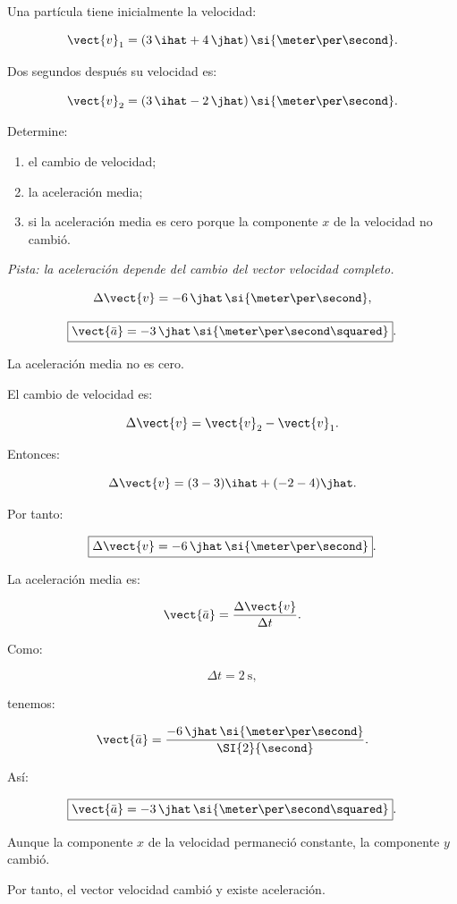\begin{ejercicio}
Una partícula tiene inicialmente la velocidad:

\[
\vect{v}_1
=
(3\,\ihat+4\,\jhat)\,
\si{\meter\per\second}.
\]

Dos segundos después su velocidad es:

\[
\vect{v}_2
=
(3\,\ihat-2\,\jhat)\,
\si{\meter\per\second}.
\]

Determine:

\begin{enumerate}[label=\alph*)]
    \item el cambio de velocidad;
    \item la aceleración media;
    \item si la aceleración media es cero porque la componente \(x\) de la velocidad no cambió.
\end{enumerate}

\textit{Pista: la aceleración depende del cambio del vector velocidad completo.}
\end{ejercicio}

\begin{respuesta}
\[
\Delta\vect{v}
=
-6\,\jhat\,
\si{\meter\per\second},
\]

\[
\boxed{
\vect{\bar{a}}
=
-3\,\jhat\,
\si{\meter\per\second\squared}
}.
\]

La aceleración media no es cero.
\end{respuesta}

\begin{explicacion}
El cambio de velocidad es:

\[
\Delta\vect{v}
=
\vect{v}_2-\vect{v}_1.
\]

Entonces:

\[
\Delta\vect{v}
=
(3-3)\ihat
+
(-2-4)\jhat.
\]

Por tanto:

\[
\boxed{
\Delta\vect{v}
=
-6\,\jhat\,
\si{\meter\per\second}
}.
\]

La aceleración media es:

\[
\vect{\bar{a}}
=
\frac{\Delta\vect{v}}{\Delta t}.
\]

Como:

\[
\Delta t=\SI{2}{\second},
\]

tenemos:

\[
\vect{\bar{a}}
=
\frac{-6\,\jhat\,\si{\meter\per\second}}
{\SI{2}{\second}}.
\]

Así:

\[
\boxed{
\vect{\bar{a}}
=
-3\,\jhat\,
\si{\meter\per\second\squared}
}.
\]

Aunque la componente \(x\) de la velocidad permaneció constante, la componente \(y\) cambió.

Por tanto, el vector velocidad cambió y existe aceleración.
\end{explicacion}


